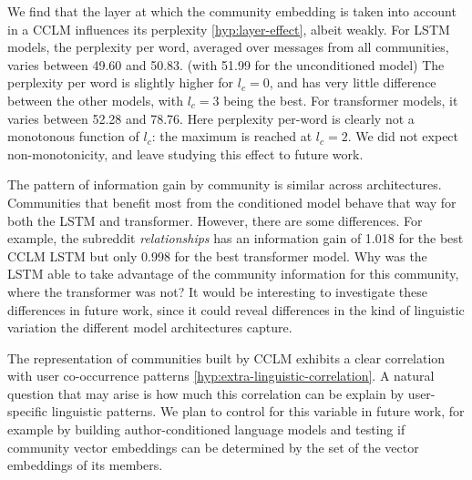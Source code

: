 \documentclass[11pt]{article}
\begin{document}
We find that the layer at which the community embedding is taken into
account in a CCLM influences its perplexity \ref{hyp:layer-effect},
albeit weakly. For LSTM models, the perplexity per word, averaged over
messages from all communities, varies between \num{49.60} and \num{50.83}. (with \num{51.99} for the
unconditioned model) The perplexity per word is slightly higher for
$l_c=0$, and has very little difference between the other models, with
$l_c=3$ being the best.  For transformer models, it varies between 
\num{52.28} and \num{78.76}. Here perplexity per-word is clearly not a monotonous
function of $l_c$: the maximum is reached at $l_c=2$. We did not
expect non-monotonicity, and leave studying this effect to future
work.

The pattern of information gain by community is similar across
architectures.  Communities that benefit most from the conditioned
model behave that way for both the LSTM and transformer.  However,
there are some differences.  For example, the subreddit
\emph{relationships} has an information gain of \num{1.018} for the
best CCLM LSTM but only \num{0.998} for the best transformer model.
Why was the LSTM able to take advantage of the community information
for this community, where the transformer was not?  It would be
interesting to investigate these differences in future work, since it
could reveal differences in the kind of linguistic variation the
different model architectures capture.

The representation of communities built by CCLM exhibits a clear
correlation with user co-occurrence patterns
\ref{hyp:extra-linguistic-correlation}. A natural
question that may arise is how much this correlation can be explain by
user-specific linguistic patterns. We plan to control for this variable
in future work, for example by building author-conditioned language
models and testing if community vector embeddings can be determined by
the set of the vector embeddings of its members.



\end{document}
